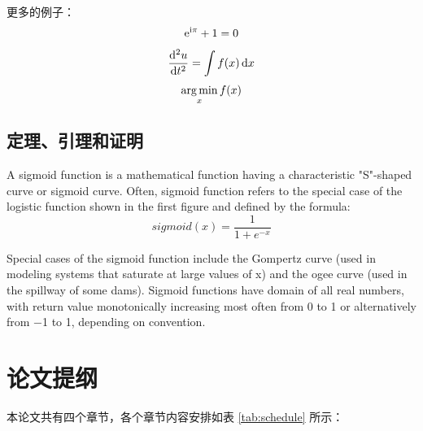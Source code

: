 \begin{framedbox}
更多的例子：
\begin{equation}
\mathrm{e}^{\mathrm{i}\pi} + 1 = 0
\end{equation}
\begin{equation}
\frac{\mathop{}\!\mathrm{d}^2u}{\mathop{}\!\mathrm{d} t^2} = \int f(x) \mathop{}\!\mathrm{d} x
\end{equation}
\begin{equation}
\operatorname*{arg\,min}_x f(x)
\end{equation}

\subsection{定理、引理和证明}


	A sigmoid function is a mathematical function having a characteristic "S"-shaped curve or sigmoid curve. Often, sigmoid function refers to the special case of the logistic function shown in the first figure and defined by the formula:
	\begin{equation}
	sigmoid(x) = \frac{1}{1 + e^{-x}}
	\end{equation}
	
	\begin{figure}[htb]
		\centering
	\end{figure}
	
	Special cases of the sigmoid function include the Gompertz curve (used in modeling systems that saturate at large values of x) and the ogee curve (used in the spillway of some dams). Sigmoid functions have domain of all real numbers, with return value monotonically increasing most often from 0 to 1 or alternatively from −1 to 1, depending on convention.



\newpage
\section{论文提纲} 
\NMUtableline

本论文共有四个章节，各个章节内容安排如表 \ref{tab:schedule} 所示：



\end{framedbox}
